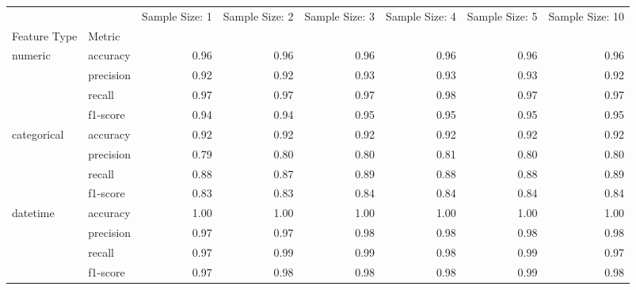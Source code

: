 \begin{tabular}{llrrrrrr}
\toprule
                 &          &  Sample Size: 1 &  Sample Size: 2 &  Sample Size: 3 &  Sample Size: 4 &  Sample Size: 5 &  Sample Size: 10 \\
Feature Type & Metric &                  &                  &                  &                  &                  &                   \\
\midrule
numeric & accuracy &             0.96 &             0.96 &             0.96 &             0.96 &             0.96 &              0.96 \\
                 & precision &             0.92 &             0.92 &             0.93 &             0.93 &             0.93 &              0.92 \\
                 & recall &             0.97 &             0.97 &             0.97 &             0.98 &             0.97 &              0.97 \\
                 & f1-score &             0.94 &             0.94 &             0.95 &             0.95 &             0.95 &              0.95 \\
categorical & accuracy &             0.92 &             0.92 &             0.92 &             0.92 &             0.92 &              0.92 \\
                 & precision &             0.79 &             0.80 &             0.80 &             0.81 &             0.80 &              0.80 \\
                 & recall &             0.88 &             0.87 &             0.89 &             0.88 &             0.88 &              0.89 \\
                 & f1-score &             0.83 &             0.83 &             0.84 &             0.84 &             0.84 &              0.84 \\
datetime & accuracy &             1.00 &             1.00 &             1.00 &             1.00 &             1.00 &              1.00 \\
                 & precision &             0.97 &             0.97 &             0.98 &             0.98 &             0.98 &              0.98 \\
                 & recall &             0.97 &             0.99 &             0.99 &             0.98 &             0.99 &              0.97 \\
                 & f1-score &             0.97 &             0.98 &             0.98 &             0.98 &             0.99 &              0.98 \\

\end{tabular}
